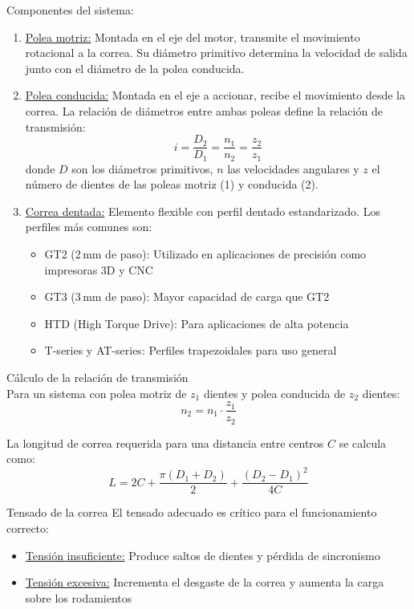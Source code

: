 Componentes del sistema:
\begin{enumerate}
    \item \underline{Polea motriz:} Montada en el eje del motor, transmite el movimiento rotacional a la correa. Su diámetro primitivo determina la velocidad de salida junto con el diámetro de la polea conducida.

    \item \underline{Polea conducida:} Montada en el eje a accionar, recibe el movimiento desde la correa. La relación de diámetros entre ambas poleas define la relación de transmisión:
    \begin{equation}
        i = \frac{D_2}{D_1} = \frac{n_1}{n_2} = \frac{z_2}{z_1}
    \end{equation}
    donde $D$ son los diámetros primitivos, $n$ las velocidades angulares y $z$ el número de dientes de las poleas motriz (1) y conducida (2).

    \item \underline{Correa dentada:} Elemento flexible con perfil dentado estandarizado. Los perfiles más comunes son:
    \begin{itemize}[label=$\bullet$]
        \item GT2 (2\,mm de paso): Utilizado en aplicaciones de precisión como impresoras 3D y CNC
        \item GT3 (3\,mm de paso): Mayor capacidad de carga que GT2
        \item HTD (High Torque Drive): Para aplicaciones de alta potencia
        \item T-series y AT-series: Perfiles trapezoidales para uso general\\
    \end{itemize}
\end{enumerate}

Cálculo de la relación de transmisión\\
Para un sistema con polea motriz de $z_1$ dientes y polea conducida de $z_2$ dientes:
\begin{equation}
    n_2 = n_1 \cdot \frac{z_1}{z_2}
\end{equation}

La longitud de correa requerida para una distancia entre centros $C$ se calcula como:
\begin{equation}
    L = 2C + \frac{\pi(D_1 + D_2)}{2} + \frac{(D_2 - D_1)^2}{4C}
\end{equation}

Tensado de la correa
El tensado adecuado es crítico para el funcionamiento correcto:
\begin{itemize}[label=$\bullet$]
    \item \underline{Tensión insuficiente:} Produce saltos de dientes y pérdida de sincronismo
    \item \underline{Tensión excesiva:} Incrementa el desgaste de la correa y aumenta la carga sobre los rodamientos
\end{itemize}


